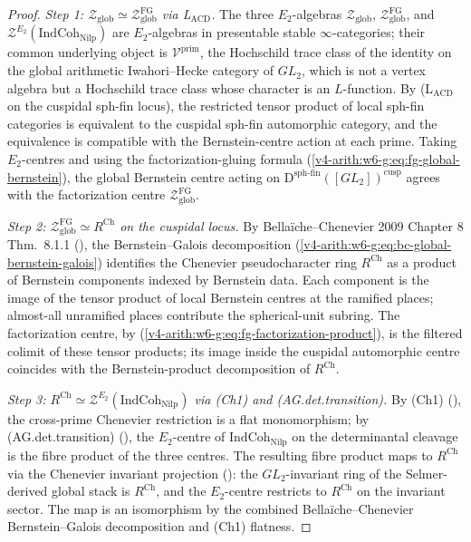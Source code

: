 \begin{proof}
\emph{Step 1: \(\mathcal{Z}_{\mathrm{glob}}\simeq\mathcal{Z}^{\mathrm{FG}}_{\mathrm{glob}}\)
via L\(_{\mathrm{ACD}}\).} The three \(E_{2}\)-algebras
\(\mathcal{Z}_{\mathrm{glob}}\), \(\mathcal{Z}^{\mathrm{FG}}_{\mathrm{glob}}\),
and \(\mathcal{Z}^{E_{2}}(\mathrm{IndCoh}_{\mathrm{Nilp}})\) are
\(E_{2}\)-algebras in presentable stable \(\infty\)-categories;
their common underlying object is \(\mathcal{V}^{\mathrm{prim}}\),
the Hochschild trace class of the identity on the global arithmetic
Iwahori--Hecke category of \(GL_{2}\), which is not a vertex algebra
but a Hochschild trace class whose character is an \(L\)-function.
By
 (L\(_{\mathrm{ACD}}\) on the
cuspidal sph-fin locus), the restricted tensor product of local
sph-fin categories is equivalent to the cuspidal sph-fin automorphic
category, and the equivalence is compatible with the Bernstein-centre
action at each prime. Taking \(E_{2}\)-centres and using the
factorization-gluing formula
(\ref{v4-arith:w6-g:eq:fg-global-bernstein}), the global Bernstein
centre acting on
\(\mathrm{D}^{\mathrm{sph\text{-}fin}}([GL_{2}])^{\mathrm{cusp}}\)
agrees with the factorization centre
\(\mathcal{Z}^{\mathrm{FG}}_{\mathrm{glob}}\).

\emph{Step 2: \(\mathcal{Z}^{\mathrm{FG}}_{\mathrm{glob}}\simeq R^{\mathrm{Ch}}\)
on the cuspidal locus.} By Bella\"iche--Chenevier 2009 Chapter 8
Thm.~8.1.1
(), the Bernstein--Galois
decomposition
(\ref{v4-arith:w6-g:eq:bc-global-bernstein-galois}) identifies the
Chenevier pseudocharacter ring \(R^{\mathrm{Ch}}\) as a product of
Bernstein components indexed by Bernstein data. Each component is the
image of the tensor product of local Bernstein centres at the
ramified places; almost-all unramified places contribute the
spherical-unit subring. The factorization centre, by
(\ref{v4-arith:w6-g:eq:fg-factorization-product}), is the filtered
colimit of these tensor products; its image inside the cuspidal
automorphic centre coincides with the Bernstein-product decomposition
of \(R^{\mathrm{Ch}}\).

\emph{Step 3: \(R^{\mathrm{Ch}}\simeq\mathcal{Z}^{E_{2}}(\mathrm{IndCoh}_{\mathrm{Nilp}})\)
via (Ch1) and (AG.det.transition).} By (Ch1)
(), the cross-prime Chenevier
restriction is a flat monomorphism; by
(AG.det.transition)
(), the
\(E_{2}\)-centre of \(\mathrm{IndCoh}_{\mathrm{Nilp}}\) on the
determinantal cleavage is the fibre product of the three centres.
The resulting fibre product maps to \(R^{\mathrm{Ch}}\) via the
Chenevier invariant projection
(): the
\(GL_{2}\)-invariant ring of the Selmer-derived global stack is
\(R^{\mathrm{Ch}}\), and the \(E_{2}\)-centre restricts to \(R^{\mathrm{Ch}}\)
on the invariant sector. The map is an isomorphism by the
combined Bella\"iche--Chenevier Bernstein--Galois decomposition and
(Ch1) flatness.


\end{proof}

